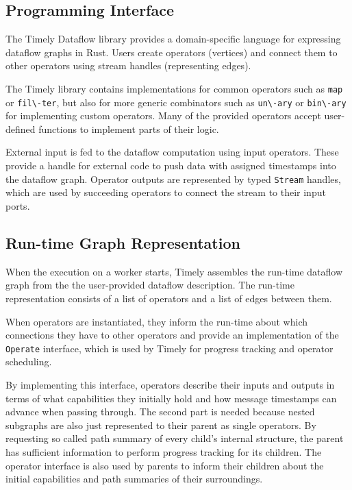 \subsection{Programming Interface}

The Timely Dataflow library provides a domain-specific language for expressing
dataflow graphs in Rust. Users create operators (vertices) and connect
them to other operators using stream handles (representing edges).

The Timely library contains implementations for common operators such as
\lstinline{map} or \lstinline{fil\-ter}, but also for more generic combinators
such as \lstinline{un\-ary} or \lstinline{bin\-ary} for implementing custom operators.
Many of the provided operators accept user-defined functions to implement
parts of their logic.

External input is fed to the dataflow computation using input operators. These
provide a handle for external code to push data with assigned timestamps into
the dataflow graph. Operator outputs are represented
by typed \lstinline{Stream} handles, which are used by succeeding operators
to connect the stream to their input ports.

\subsection{Run-time Graph Representation} \label{sec:runtime-graph}

When the execution on a worker starts, Timely assembles the run-time
dataflow graph from the the user-provided dataflow description. The run-time
representation consists of a list of operators and a list of edges between them.

When operators are instantiated, they inform the run-time about which
connections they have to other operators and provide an implementation
of the \lstinline{Operate} interface, which is used by Timely for progress
tracking and operator scheduling.

By implementing this interface, operators describe their inputs and
outputs in terms of what capabilities they initially hold and how message
timestamps can advance when passing through. The second part is needed because
nested subgraphs are also just represented to their parent as single operators.
By requesting so called path summary of every child's internal structure, the
parent has sufficient information to perform progress tracking for its
children. The operator interface is also used by parents to inform their children
about the initial capabilities and path summaries of their surroundings.

